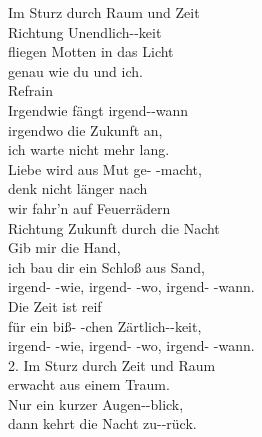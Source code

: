 Im Sturz durch Raum und  Zeit \\
Richtung Unendlich--keit \\
 fliegen Motten in das  Licht \\
genau wie du und  ich.  \\
Refrain \\
 Irgendwie fängt irgend--wann \\
irgendwo die Zukunft  an, \\
ich warte nicht mehr  lang. \\
 Liebe wird aus Mut ge-  -macht, \\
denk nicht länger nach \\
wir  fahr’n auf Feuerrädern \\
Richtung  Zukunft durch die Nacht \\
 Gib mir die  Hand, \\
ich bau  dir ein Schloß aus  Sand, \\
irgend- -wie, irgend- -wo, irgend- -wann. \\
 Die Zeit ist  reif \\
für ein biß- -chen Zärtlich--keit, \\
irgend- -wie, irgend- -wo, irgend- -wann. \\
2.  Im Sturz durch Zeit und  Raum \\
erwacht aus einem  Traum.  \\
 Nur ein kurzer Augen--blick, \\
dann kehrt die Nacht zu--rück.  \Reff \\
